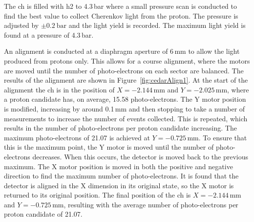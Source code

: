 \documentclass[../../main.tex]{subfiles}
\begin{document}
    The \gls{ch} is filled with \gls{h2} to 4.3\,bar where a small pressure scan is conducted to find the best value to collect Cherenkov light from the proton. The pressure is adjusted by $\pm\SI{0.2}{\bar}$ and the light yield is recorded. The maximum light yield is found at a pressure of 4.3\,bar.


    An alignment is conducted at a diaphragm aperture of 6\,mm to allow the light produced from protons only. This allows for a course alignment, where the motors are moved until the number of photo-electrons on each sector are balanced. The results of the 
    alignment are shown in Figure~\ref{fig:cedarAlign1}. At the start of the alignment the \gls{ch} is in the position of \mbox{$X=-2.144$\,mm} and \mbox{$Y=-2.025$\,mm}, where a proton candidate has, on average, 15.58 photo-electrons. The Y motor position is modified, increasing by around 0.1\,mm and then 
    stopping to take a number of measurements to increase the number of events collected. This is repeated, which results in the number of photo-electrons per proton candidate increasing. The maximum photo-electrons of 21.07 is achieved at $Y=-0.725$\,mm. To ensure that this is the maximum point, the Y motor is moved until the 
    number of photo-electrons decreases. When this occurs, the detector is moved back to the previous maximum. The X motor position is moved in both the positive and negative direction to find the maximum number of photo-electrons. It is found that the detector is aligned in the X dimension in its original state, so the X motor is returned to its original position.
    The final position of the \gls{ch} is $X=-2.144$\,mm and $Y=-0.725$\,mm, resulting with the average number of photo-electrons per proton candidate of 21.07. %
\end{document}
